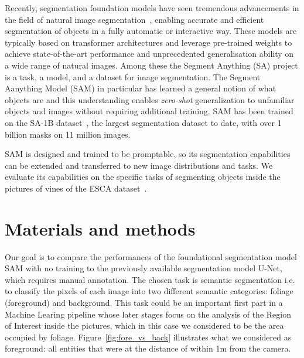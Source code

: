 \documentclass[runningheads]{llncs}
\begin{document}
Recently, segmentation foundation models have seen tremendous advancements in the field of natural image segmentation~\cite{2023-SegGPT}\cite{2023-SEEM}, enabling accurate and efficient segmentation of objects in a fully automatic or interactive way. These models are typically based on transformer architectures and leverage pre-trained weights to achieve state-of-the-art performance and unprecedented generalisation ability on a wide range of natural images. Among these the Segment Anything (SA) project \cite{2023-SAM-Meta} is a task, a model, and a dataset for image segmentation. The Segment Aanything Model (SAM) in particular has learned a general notion of what objects are and this understanding enables \emph{zero-shot} generalization to unfamiliar objects and images without requiring additional training. SAM has been trained on the SA-1B dataset~\cite{SA-1B_dataset}, the largest segmentation dataset to date, with over 1 billion masks on 11 million images. 

SAM is designed and trained to be promptable, so its segmentation capabilities can be extended and transferred to new image distributions and tasks. We evaluate its capabilities on the specific tasks of segmenting objects inside the pictures of vines of the ESCA dataset~\cite{ESCA_dataset}. 


\section{Materials and methods}

Our goal is to compare the performances of the foundational segmentation model SAM with no training to the previously available segmentation model U-Net, which requires manual annotation. The chosen task is semantic segmentation i.e. to classify the pixels of each image into two different semantic categories: foliage (foreground) and background. This task could be an important first part in a Machine Learing pipeline whose later stages focus on the analysis of the Region of Interest inside the pictures, which in this case we considered to be the area occupied by foliage. Figure~\ref{fig:fore_vs_back} illustrates {\color{red} what we considered as foreground: all entities that were at the distance of within 1m from the camera.}
\end{document}
